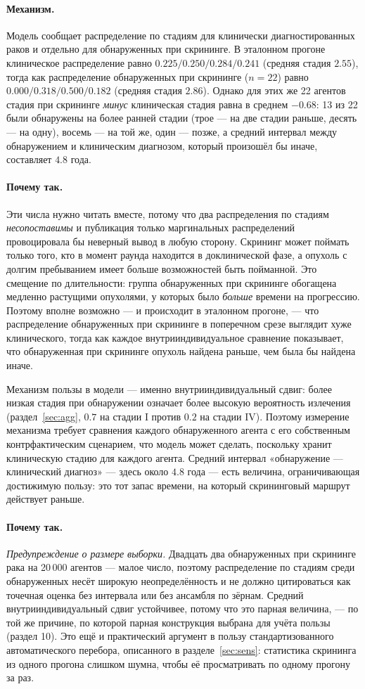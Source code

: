 \documentclass[12pt,a4paper]{article}
\newcommand{\mech}[1]{\paragraph{Механизм.} #1}
\newcommand{\why}[1]{\paragraph{Почему так.} #1}
\begin{document}
\mech{Модель сообщает распределение по стадиям для клинически диагностированных раков и отдельно для
обнаруженных при скрининге. В эталонном прогоне клиническое распределение равно $0.225/0.250/0.284/0.241$
(средняя стадия $2.55$), тогда как распределение обнаруженных при скрининге ($n = 22$) равно
$0.000/0.318/0.500/0.182$ (средняя стадия $2.86$). Однако для этих же 22 агентов стадия при скрининге
\emph{минус} клиническая стадия равна в среднем $-0.68$: 13 из 22 были обнаружены на более ранней стадии
(трое --- на две стадии раньше, десять --- на одну), восемь --- на той же, один --- позже, а средний интервал
между обнаружением и клиническим диагнозом, который произошёл бы иначе, составляет $4.8$ года.}

\why{Эти числа нужно читать вместе, потому что два распределения по стадиям \emph{несопоставимы} и
публикация только маргинальных распределений провоцировала бы неверный вывод в любую сторону. Скрининг может
поймать только того, кто в момент раунда находится в доклинической фазе, а опухоль с долгим пребыванием имеет
больше возможностей быть пойманной. Это смещение по длительности: группа обнаруженных при скрининге
обогащена медленно растущими опухолями, у которых было \emph{больше} времени на прогрессию. Поэтому вполне
возможно --- и происходит в эталонном прогоне, --- что распределение обнаруженных при скрининге в поперечном
срезе выглядит хуже клинического, тогда как каждое внутрииндивидуальное сравнение показывает, что
обнаруженная при скрининге опухоль найдена раньше, чем была бы найдена иначе.

Механизм пользы в модели --- именно внутрииндивидуальный сдвиг: более низкая стадия при обнаружении означает
более высокую вероятность излечения (раздел~\ref{sec:agg}, $0.7$ на стадии I против $0.2$ на стадии IV).
Поэтому измерение механизма требует сравнения каждого обнаруженного агента с его собственным контрфактическим
сценарием, что модель может сделать, поскольку хранит клиническую стадию для каждого агента. Средний
интервал «обнаружение --- клинический диагноз» --- здесь около $4.8$ года --- есть величина, ограничивающая
достижимую пользу: это тот запас времени, на который скрининговый маршрут действует раньше.}

\why{\emph{Предупреждение о размере выборки.} Двадцать два обнаруженных при скрининге рака на 20\,000
агентов --- малое число, поэтому распределение по стадиям среди обнаруженных несёт широкую
неопределённость и не должно цитироваться как точечная оценка без интервала или без ансамбля по зёрнам.
Средний внутрииндивидуальный сдвиг устойчивее, потому что это парная величина, --- по той же причине, по
которой парная конструкция выбрана для учёта пользы (раздел 10). Это ещё и практический аргумент в пользу
стандартизованного автоматического перебора, описанного в разделе~\ref{sec:sens}: статистика скрининга из
одного прогона слишком шумна, чтобы её просматривать по одному прогону за раз.}
\end{document}

